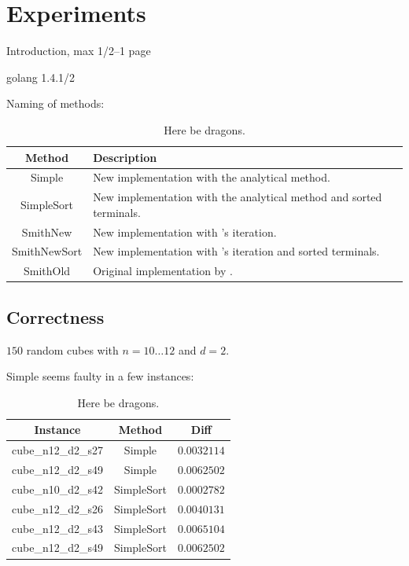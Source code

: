 {
\abnormalparskip{0pt}
\chapter{Experiments}
\label{cha:experiments}
}

Introduction, max 1/2--1 page

golang 1.4.1/2

Naming of methods:
\begin{table}[htbp]
  \centering
  \begin{tabular}{cp{9cm}}
    \toprule
    Method       & Description                                      \\
    \midrule
    Simple       & New implementation with the analytical method.   \\
    SimpleSort   & New implementation with the analytical method and sorted
                   terminals.                                       \\
    SmithNew     & New implementation with \citeauthor{smith1992}'s
                   iteration.                                       \\
    SmithNewSort & New implementation with \citeauthor{smith1992}'s iteration
                   and sorted terminals.                            \\
    SmithOld     & Original implementation by \textcite{smith1992}. \\
    \bottomrule
  \end{tabular}
  \caption[Here be dragons]{Here be dragons.\label{tab:method-names}}
\end{table}

\section{Correctness}
\label{sec:correctness}

$150$ random cubes with $n = 10 \ldots 12$ and $d = 2$.

Simple seems faulty in a few instances:

\begin{table}[htbp]
  \centering
  \begin{tabular}{ccc}
    \toprule
    Instance           & Method     & Diff        \\
    \midrule
    cube\_n12\_d2\_s27 & Simple     & $0.0032114$ \\
    cube\_n12\_d2\_s49 & Simple     & $0.0062502$ \\
    cube\_n10\_d2\_s42 & SimpleSort & $0.0002782$ \\
    cube\_n12\_d2\_s26 & SimpleSort & $0.0040131$ \\
    cube\_n12\_d2\_s43 & SimpleSort & $0.0065104$ \\
    cube\_n12\_d2\_s49 & SimpleSort & $0.0062502$ \\
    \bottomrule
  \end{tabular}
  \caption[Here be dragons]{Here be dragons.\label{tab:correctness-errors}}
\end{table}

